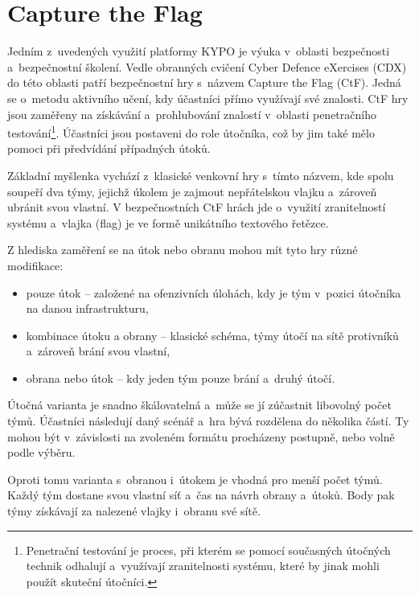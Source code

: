 \documentclass[
  digital, %
  oneside, %
  table,   %
  nolof,     %
  nolot,     %
  nocover
]{fithesis3}
\begin{document}
\section{Capture the Flag}
Jedním z~uvedených využití platformy KYPO je výuka v~oblasti bezpečnosti a~bezpečnostní školení. Vedle obranných cvičení Cyber Defence eXercises (CDX) do této oblasti patří bezpečnostní hry s~názvem Capture the Flag (CtF). \cite{ctfDesign} Jedná se o~metodu aktivního učení, kdy účastníci přímo využívají své znalosti. CtF hry jsou zaměřeny na získávání a~prohlubování znalostí v~oblasti penetračního testování\footnote{Penetrační testování je proces, při kterém se pomocí současných útočných technik odhalují a~využívají zranitelnosti systému, které by jinak mohli použít skuteční útočníci.}. Účastníci jsou postaveni do role útočníka, což by jim také mělo pomoci při předvídání případných útoků. \cite{lessons2015, ctfDesign}\par
Základní myšlenka vychází z~klasické venkovní hry s~tímto názvem, kde spolu soupeří dva týmy, jejichž úkolem je zajmout nepřátelskou vlajku a~zároveň ubránit svou vlastní. V bezpečnostních CtF hrách jde o~využití zranitelností systému a~vlajka (flag) je ve formě unikátního textového řetězce.\par
Z hlediska zaměření se na útok nebo obranu mohou mít tyto hry různé modifikace: \cite{Dankovcikova2015thesis, ctfDesign}
\begin{itemize}
  \item pouze útok – založené na ofenzivních úlohách, kdy je tým v~pozici útočníka na danou infrastrukturu,
  \item kombinace útoku a obrany – klasické schéma, týmy útočí na sítě protivníků a~zároveň brání svou vlastní,
  \item obrana nebo útok – kdy jeden tým pouze brání a~druhý útočí.
\end{itemize}
Útočná varianta je snadno škálovatelná a~může se jí zúčastnit libovolný počet týmů. Účastníci následují daný scénář a~hra bývá rozdělena do několika částí. Ty mohou být v~závislosti na zvoleném formátu procházeny postupně, nebo volně podle výběru.\par
Oproti tomu varianta s~obranou i~útokem je vhodná pro menší počet týmů. Každý tým dostane svou vlastní síť a~čas na návrh obrany a~útoků. Body pak týmy získávají za nalezené vlajky i~obranu své sítě. \cite{Masarik2017thesis}
\end{document}
